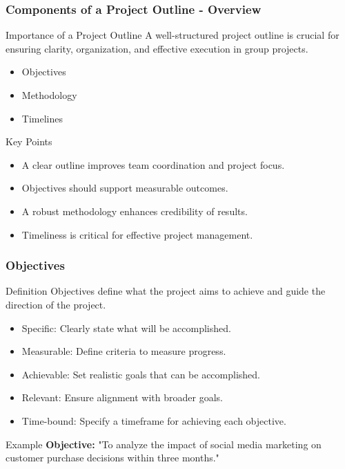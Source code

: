 \documentclass[aspectratio=169]{beamer}
\begin{document}
\begin{frame}[fragile]
    \frametitle{Components of a Project Outline - Overview}
    \begin{block}{Importance of a Project Outline}
        A well-structured project outline is crucial for ensuring clarity, organization, and effective execution in group projects.
    \end{block}
    
    \begin{itemize}
        \item Objectives
        \item Methodology
        \item Timelines
    \end{itemize}

    \begin{block}{Key Points}
        \begin{itemize}
            \item A clear outline improves team coordination and project focus.
            \item Objectives should support measurable outcomes.
            \item A robust methodology enhances credibility of results.
            \item Timeliness is critical for effective project management.
        \end{itemize}
    \end{block}
\end{frame}

\begin{frame}[fragile]
    \frametitle{Objectives}
    \begin{block}{Definition}
        Objectives define what the project aims to achieve and guide the direction of the project.
    \end{block}

    \begin{itemize}
        \item Specific: Clearly state what will be accomplished.
        \item Measurable: Define criteria to measure progress.
        \item Achievable: Set realistic goals that can be accomplished.
        \item Relevant: Ensure alignment with broader goals.
        \item Time-bound: Specify a timeframe for achieving each objective.
    \end{itemize}

    \begin{block}{Example}
        \textbf{Objective:} "To analyze the impact of social media marketing on customer purchase decisions within three months."
    \end{block}
\end{frame}
\end{document}
